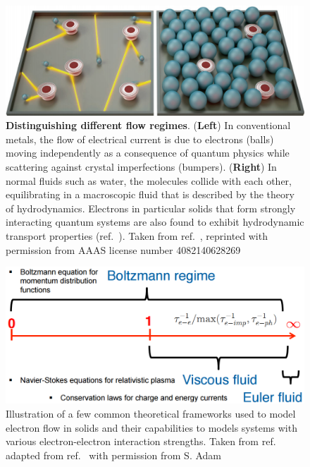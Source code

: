 \begin{figure}
\centering
\includegraphics[width = 130mm]{figures/hydro_theory/cartoon_hydro.png}
\caption{\textbf{Distinguishing different flow regimes}. (\textbf{Left}) In conventional metals, the flow of electrical current is due to electrons (balls) moving independently as a consequence of quantum physics while scattering against crystal imperfections (bumpers). (\textbf{Right}) In normal fluids such as water, the molecules collide with each other, equilibrating in a macroscopic fluid that is described by the theory of hydrodynamics. Electrons in particular solids that form strongly interacting quantum systems are also found to exhibit hydrodynamic transport properties (ref.~\cite{crossno_observation_2016, bandurin_negative_2016, moll_evidence_2016}). Taken from ref.~\cite{zaanen_electrons_2016}, reprinted with permission from AAAS license number 4082140628269}
\end{figure}



\begin{figure}
\centering
\includegraphics[width = 130mm]{figures/hydro_theory/Boltzmann.png}
\caption{Illustration of a few common theoretical frameworks used to model electron flow in solids and their capabilities to models systems with various electron-electron interaction strengths. Taken from ref.~\cite{adam_theoretical_2017} adapted from ref.~\cite{briskot_collision-dominated_2015} with permission from S. Adam}
\label{fig:Boltzmann_vs_hydro}
\end{figure}



